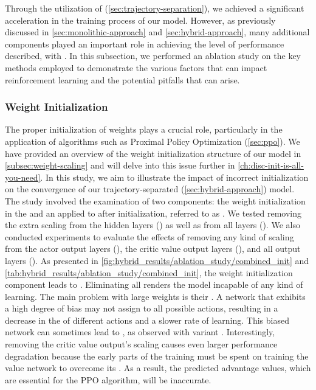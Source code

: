 \noindent Through the utilization of  (\autoref{sec:trajectory-separation}), we achieved a significant acceleration in the training process of our model. However, as previously discussed in \autoref{sec:monolithic-approach} and \autoref{sec:hybrid-approach}, many additional components played an important role in achieving the level of performance described, with . In this subsection, we performed an ablation study on the key methods employed to demonstrate the various factors that can impact reinforcement learning and the potential pitfalls that can arise.

\subsubsection{Weight Initialization}

\noindent The proper initialization of weights plays a crucial role, particularly in the application of algorithms such as Proximal Policy Optimization (\autoref{sec:ppo}). We have provided an overview of the weight initialization structure of our model in \autoref{subsec:weight-scaling} and will delve into this issue further in \autoref{ch:disc-init-is-all-you-need}. In this study, we aim to illustrate the impact of incorrect initialization on the convergence of our trajectory-separated  (\autoref{sec:hybrid-approach}) model. The study involved the examination of two components: the weight initialization  in the  and an  applied to  after initialization, referred to as . We tested removing the extra scaling from the hidden layers () as well as from all layers (). We also conducted experiments to evaluate the effects of removing any kind of scaling from the actor output layers (), the critic value output layers (), and all output layers (). As presented in \autoref{fig:hybrid_results/ablation_study/combined_init} and \autoref{tab:hybrid_results/ablation_study/combined_init}, the  weight initialization component leads to . Eliminating all  renders the model incapable of any kind of learning. The main problem with large weights is their . A network that exhibits a high degree of bias may not assign  to all possible actions, resulting in a decrease in the  of different actions and a slower rate of learning. This biased network can sometimes lead to , as observed with variant . Interestingly, removing the critic value output's scaling causes even larger performance degradation because the early parts of the training must be spent on training the value network to overcome its . As a result, the predicted advantage values, which are essential for the PPO algorithm, will be inaccurate.

